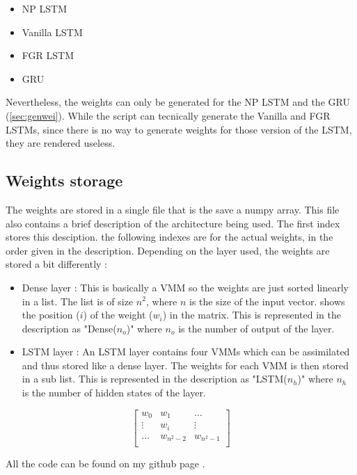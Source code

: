 \begin{itemize}
  \item \ac{NP} \ac{LSTM}
  \item Vanilla \ac{LSTM}
  \item \ac{FGR} \ac{LSTM}
  \item \ac{GRU}
\end{itemize}

Nevertheless, the weights can only be generated for the \ac{NP} \ac{LSTM} and the \ac{GRU} (\cref{sec:genwei}). While the script can tecnically generate the Vanilla and \ac{FGR} \acp{LSTM}, since there is no way to generate weights for those version of the \ac{LSTM}, they are rendered useless.

\subsection{Weights storage}\label{subsec:weiStore}

The weights are stored in a single file that is the save a numpy array. This file also contains a brief description of the architecture being used. The first index stores this desciption. the following indexes are for the actual weights, in the order given in the description. Depending on the layer used, the weights are stored a bit differently :

\begin{itemize}
  \item Dense layer : This is basically a \ac{VMM} so the weights are just sorted linearly in a list. The list is of size $n^2$, where $n$ is the size of the input vector.  shows the position ($i$) of the weight ($w_i$) in the matrix. This is represented in the description as "Dense($n_o$)" where $n_o$ is the number of output of the layer.
  \item \ac{LSTM} layer : An \ac{LSTM} layer contains four \acp{VMM} which can be assimilated and thus stored like a dense layer. The weights for each \ac{VMM} is then stored in a sub list. This is represented in the description as "LSTM($n_h$)" where $n_h$ is the number of hidden states of the layer.
\end{itemize}

\begin{equation}\label{mtrx:wei}
  \begin{bmatrix}
    w_{0} & w_{1} & \dots \\
    \vdots & w_i & \vdots \\
    \dots & w_{n^2-2} & w_{n^2-1}\\
  \end{bmatrix}
\end{equation}

All the code can be found on my github page \cite{lstmGen}.
